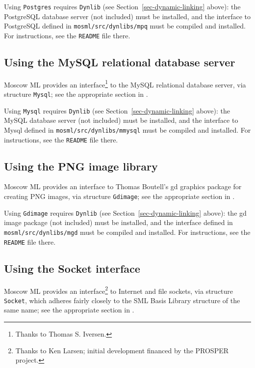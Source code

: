 \documentclass[fleqn,a4paper]{article}
\begin{document}
Using \texttt{Postgres} requires {\tt Dynlib} (see
Section~\ref{sec-dynamic-linking} above): the PostgreSQL database server
(not included) must be installed, and the interface to PostgreSQL
defined in {\tt mosml/src/dynlibs/mpq} must be compiled and installed.
For instructions, see the {\tt README} file there.


\subsection{Using the MySQL relational database server}
\label{sec-using-mmysql}

Moscow ML provides an interface\footnote{Thanks to Thomas S.
  Iversen.} to the MySQL relational database server, via structure
{\tt Mysql}; see the appropriate section in
\cite{MoscowML:2000:MoscowMLLibrary}.

Using \texttt{Mysql} requires {\tt Dynlib} (see
Section~\ref{sec-dynamic-linking} above): the MySQL database server (not
included) must be installed, and the interface to Mysql defined in
{\tt mosml/src/dynlibs/mmysql} must be compiled and installed.  For
instructions, see the {\tt README} file there.


\subsection{Using the PNG image library}
\label{sec-using-mgd}

Moscow ML provides an interface to Thomas Boutell's gd graphics
package for creating PNG images, via structure {\tt Gdimage}; see the
appropriate section in \cite{MoscowML:2000:MoscowMLLibrary}.

Using \texttt{Gdimage} requires {\tt Dynlib} (see
Section~\ref{sec-dynamic-linking} above): the gd image package (not
included) must be installed, and the interface defined in {\tt
  mosml/src/dynlibs/mgd} must be compiled and installed.  For
instructions, see the {\tt README} file there.


\subsection{Using the Socket interface}
\label{sec-using-msocket}

Moscow ML provides an interface\footnote{Thanks to Ken Larsen; initial
  development financed by the PROSPER project.} to Internet and file
sockets, via structure {\tt Socket}, which adheres fairly closely to
the SML Basis Library structure of the same name; see the
appropriate section in \cite{MoscowML:2000:MoscowMLLibrary}.
\end{document}
